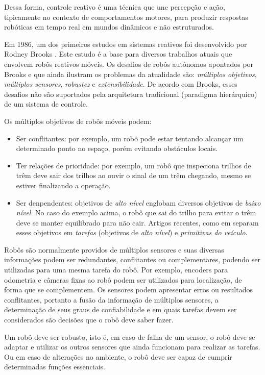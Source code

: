 Dessa forma, controle reativo é uma técnica que une percepção e ação,
tipicamente no contexto de comportamentos motores, para produzir respostas
robóticas em tempo real em mundos dinâmicos e não estruturados.

Em 1986, um dos primeiros estudos em sistemas reativos foi desenvolvido por
Rodney Brooks \cite{brooks1986robust}. Este estudo é a base para diversos
trabalhos atuais que envolvem robôs reativos móveis. Os desafios de
robôs autônomos apontados por Brooks e que ainda ilustram os problemas da
atualidade são: \emph{múltiplos objetivos}, \emph{múltiplos sensores},
\emph{robustez} e \emph{extensibilidade}. De acordo com Brooks, esses desafios
não são suportados pela arquitetura tradicional (paradigma hierárquico) de um
sistema de controle.

Os múltiplos objetivos de robôs móveis podem:
\begin{itemize}
  \item Ser conflitantes: por exemplo, um robô pode estar tentando alcançar um
  determinado ponto no espaço, porém evitando obstáculos locais.
  \item Ter relações de prioridade: por exemplo, um robô que inspeciona trilhos
  de trêm deve sair dos trilhos ao ouvir o sinal de um trêm chegando, mesmo se estiver
  finalizando a operação.
  \item Ser denpendentes: objetivos de \emph{alto nível} englobam diversos
  objetivos de \emph{baixo nível}. No caso do exemplo acima, o robô que sai do
  trilho para evitar o trêm deve se manter equilibrado para não cair. Artigos
  recentes, como em \cite{fryxell1996navigation} separam esses objetivos em
  \emph{tarefas} (objetivos de \emph{alto nível}) e \emph{primitivas do veículo}.
\end{itemize}

Robôs são normalmente providos de múltiplos sensores e suas diversas
informações podem ser redundantes, conflitantes ou complementares,
podendo ser utilizadas para uma mesma tarefa do robô.
Por exemplo, encoders para odometria e câmeras fixas ao robô
podem ser utilizados para localização, de forma que se complementem.
Os sensores podem apresentar erros ou resultados conflitantes, portanto a fusão
da informação de múltiplos sensores, a determinação de seus graus de
confiabilidade e em quais tarefas devem ser considerados são decisões que o
robô deve saber fazer.

Um robô deve ser robusto, isto é, em caso de falha de um sensor, o robô
deve se adaptar e utilizar os outros sensores que ainda funcionam para realizar as
tarefas. Ou em caso de alterações no ambiente, o robô deve ser
capaz de cumprir determinadas funções essenciais.


